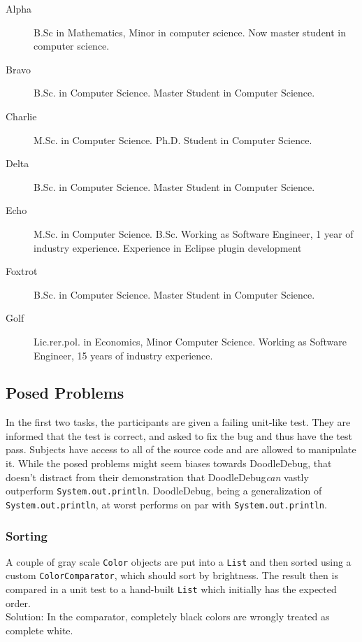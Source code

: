 \documentclass[english]{scrartcl}
\newcommand{\DD}{Dood\-le\-De\-bug\xspace}
\newcommand{\println}{\texttt{Sys\-tem.\-out.\-println}\xspace}
\begin{document}
\begin{description}
\item [{Alpha}] B.Sc in Mathematics, Minor in computer science. Now master student in computer science. %
\item [{Bravo}] B.Sc. in Computer Science. Master Student  in Computer Science.
\item [{Charlie}] M.Sc. in Computer Science. Ph.D. Student in Computer Science.
\item [{Delta}] B.Sc. in Computer Science. Master Student  in Computer Science.
\item [{Echo}] M.Sc. in Computer Science. B.Sc. Working as Software Engineer, 1 year of industry experience. Experience in Eclipse plugin development
\item [{Foxtrot}] B.Sc. in Computer Science. Master Student  in Computer Science.
\item [{Golf}] Lic.rer.pol. in Economics, Minor Computer Science. Working as Software Engineer, 15 years of industry experience. %
\end{description}

\subsection{Posed Problems}
In the first two tasks, the participants are given a failing unit-like test. They are informed that the test is correct, and asked to fix the bug and thus have the test pass. Subjects have access to all of the source code and are allowed to manipulate it.
While the posed problems might seem biases towards \DD, that doesn't distract from their demonstration that \DD \emph{can} vastly outperform \println. \DD, being a generalization of \println, at worst performs on par with \println.

\subsubsection{Sorting}
A couple of gray scale \texttt{Color} objects are put into a \texttt{List}
and then sorted using a custom \texttt{ColorComparator}, which should sort by brightness.
The result then is compared in a unit test to a hand-built \texttt{List} which initially has the expected order.\\
Solution: In the comparator, completely black colors are wrongly treated as complete white.
\end{document}
